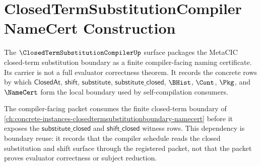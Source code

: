 \chapter{ClosedTermSubstitutionCompiler NameCert Construction}
\label{ch:concrete-instances-closedtermsubstitutioncompiler-namecert}

The $\ClosedTermSubstitutionCompilerUp$ surface packages the MetaCIC closed-term substitution boundary as a finite compiler-facing naming certificate. Its carrier is not a full evaluator correctness theorem. It records the concrete rows by which $\mathsf{ClosedAt}$, $\mathsf{shift}$, $\mathsf{substitute}$, $\mathsf{substitute\_closed}$, $\BHist$, $\Cont$, $\Pkg$, and $\NameCert$ form the local boundary used by self-compilation consumers.

The compiler-facing packet consumes the finite closed-term boundary of \autoref{ch:concrete-instances-closedtermsubstitutionboundary-namecert} before it exposes the $\mathsf{substitute\_closed}$ and $\mathsf{shift\_closed}$ witness rows. This dependency is boundary reuse: it records that the compiler schedule reads the closed substitution and shift surface through the registered packet, not that the packet proves evaluator correctness or subject reduction.

